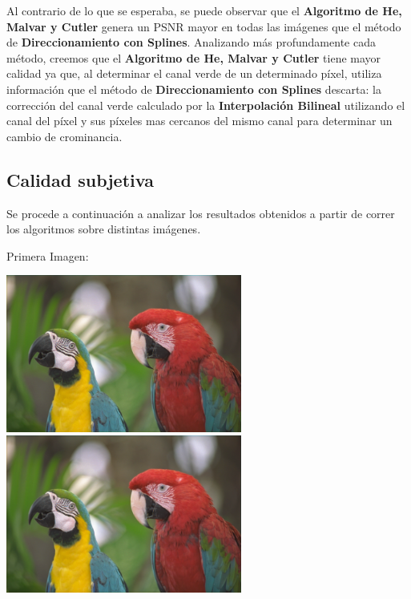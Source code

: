 \documentclass[a4paper]{article}
\begin{document}
Al contrario de lo que se esperaba, se puede observar que el \textbf{Algoritmo de He, Malvar y Cutler} genera un PSNR mayor en todas las imágenes que el método de \textbf{Direccionamiento con Splines}. Analizando más profundamente cada método, creemos que el \textbf{Algoritmo de He, Malvar y Cutler} tiene mayor calidad ya que, al determinar el canal verde de un determinado píxel, utiliza información que el método de \textbf{Direccionamiento con Splines} descarta: la corrección del canal verde calculado por la \textbf{Interpolación Bilineal} utilizando el canal del píxel y sus píxeles mas cercanos del mismo canal para determinar un cambio de crominancia.\\

\newpage

\subsection{Calidad subjetiva}

Se procede a continuación a analizar los resultados obtenidos a partir de correr los algoritmos sobre distintas imágenes.


Primera Imagen:
\smallskip

\includegraphics[width=220pt]{img/img1-0.png}       %
\includegraphics[width=220pt]{img/img1-1.png}       %
\end{document}
